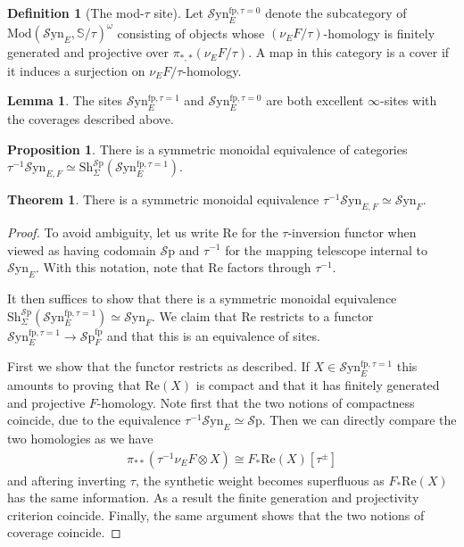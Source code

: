 \documentclass[10pt]{amsart}
\theoremstyle{definition}
\numberwithin{figure}{section}
\numberwithin{equation}{section}
\newtheorem{theorem}[figure]{Theorem}
\newtheorem{lemma}[figure]{Lemma}
\newtheorem{proposition}[figure]{Proposition}
\newtheorem{definition}[figure]{Definition}
\theoremstyle{cited}
\newcommand{\bS}{\mathbb{S}}
\newcommand{\Sp}{{\mathcal{S}\mathrm{p}}}
\newcommand{\Mod}{\mathrm{Mod}}
\newcommand{\Sh}{\mathrm{Sh}}
\newcommand{\fp}{\mathrm{fp}}
\newcommand{\Syn}{\mathcal{S}\mathrm{yn}}
\renewcommand{\Re}{\mathrm{Re}}
\begin{document}
\begin{definition}[The mod-$\tau$ site]
  Let $\Syn_E^{\fp, \tau=0}$ denote the subcategory of $\Mod(\Syn_E, \bS/\tau)^\omega$ consisting of objects whose $(\nu_E F/\tau)$-homology is finitely generated and projective over $\pi_{*,*}(\nu_E F/ \tau)$. A map in this category is a cover if it induces a surjection on $\nu_E F/ \tau$-homology.
\end{definition}

\begin{lemma}
  The sites $\Syn_E^{\fp, \tau=1}$ and $\Syn_E^{\fp, \tau=0}$ are both excellent $\infty$-sites with the coverages described above.
\end{lemma}

\begin{proposition}
  There is a symmetric monoidal equivalence  of categories $\tau^{-1}\Syn_{E,F}\simeq \Sh_{\Sigma}^\Sp(\Syn_E^{\fp, \tau=1})$.
\end{proposition}

\begin{theorem}
  There is a symmetric monoidal equivalence $\tau^{-1}\Syn_{E,F}\simeq \Syn_F$.
\end{theorem}

\begin{proof}
  To avoid ambiguity, let us write $\Re$ for the $\tau$-inversion functor when viewed as having codomain $\Sp$ and $\tau^{-1}$ for the mapping telescope internal to $\Syn_E$. With this notation, note that $\Re$ factors through $\tau^{-1}$.
  
  
  It then suffices to show that there is a symmetric monoidal equivalence $\Sh_{\Sigma}^\Sp(\Syn_E^{\fp, \tau=1})\simeq \Syn_F$. We claim that $\Re$ restricts to a functor $\Syn_E^{\fp, \tau=1}\to \Sp^\fp_F$ and that this is an equivalence of sites. 

  First we show that the functor restricts as described. If $X\in \Syn_E^{\fp, \tau=1}$ this amounts to proving that $\Re(X)$ is compact and that it has finitely generated and projective $F$-homology. Note first that the two notions of compactness coincide, due to the equivalence $\tau^{-1}\Syn_E\simeq \Sp$. Then we can directly compare the two homologies as we have
  \begin{align*}
    \pi_{**}(\tau^{-1}\nu_E F\otimes X)\cong F_*\Re(X)[\tau^{\pm}]
  \end{align*}
  and aftering inverting $\tau$, the synthetic weight becomes superfluous as $F_*\Re(X)$ has the same information. As a result the finite generation and projectivity criterion coincide. Finally, the same argument shows that the two notions of coverage coincide.
\end{proof}
\end{document}
